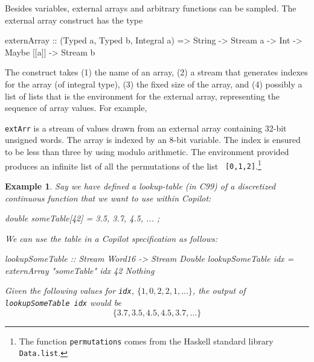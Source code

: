 \documentclass[]{article}
\theoremstyle{example}
\newtheorem{example}{Example}
\begin{document}
Besides variables, external arrays and arbitrary functions can be sampled.  The
external array construct has the type
%
\begin{code}
externArray :: (Typed a, Typed b, Integral a) 
            => String -> Stream a -> Int 
            -> Maybe [[a]] -> Stream b  
\end{code}
%
The construct takes (1) the name of an array, (2) a stream that generates indexes for
the array (of integral type), (3) the fixed size of the array, and (4) possibly a list of lists that is the
environment for the external array, representing the sequence of array values.  For example,
%
{\tt extArr} is a stream of values drawn from an external array containing
32-bit unsigned words.  The array is indexed by an 8-bit variable.  The index
is ensured to be less than three by using modulo arithmetic.  The environment
provided produces an infinite list of all the permutations of the list {\tt
  [0,1,2]}.\footnote{The function {\tt permutations} comes from the Haskell
    standard library {\tt Data.list}.}



%
\begin{example}
\label{exm:e}
Say we have defined a lookup-table (in C99) of a discretized continuous function that we want to use
within Copilot:
%
\begin{code}
double someTable[42] = { 3.5, 3.7, 4.5, ... };
\end{code}
%
We can use the table in a Copilot specification as follows:
%
\begin{code}
lookupSomeTable :: Stream Word16 -> Stream Double
lookupSomeTable idx = 
  externArray "someTable" idx 42 Nothing
\end{code}
%
Given the following values for \texttt{idx}, $\{1, 0, 2, 2, 1, \dots \}$, the output of 
\texttt{lookupSomeTable idx} would be $$\{3.7, 3.5, 4.5, 4.5, 3.7, \dots \}$$
\end{example}
\end{document}

